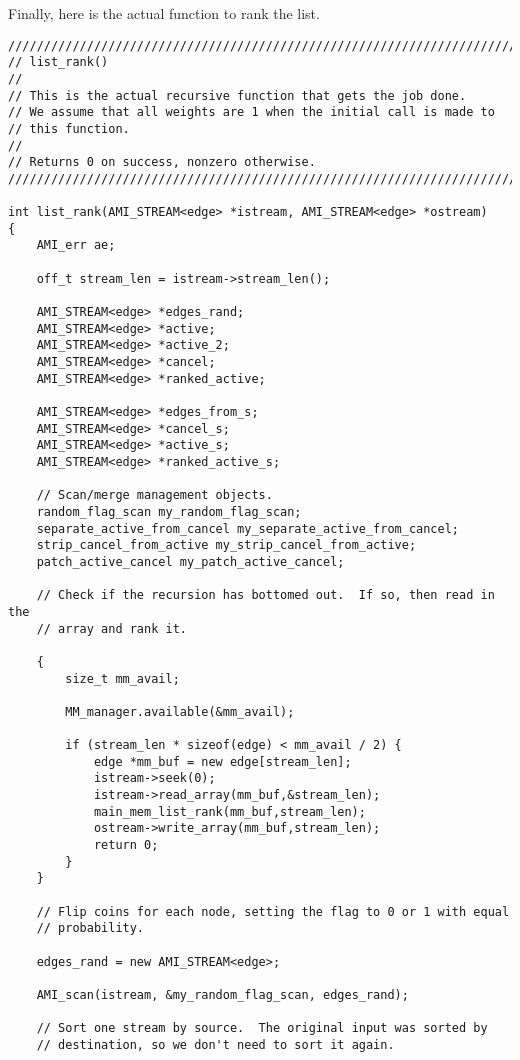 Finally, here is the actual function to rank the list.

\begin{verbatim}
////////////////////////////////////////////////////////////////////////
// list_rank()
//
// This is the actual recursive function that gets the job done.
// We assume that all weights are 1 when the initial call is made to
// this function.
//
// Returns 0 on success, nonzero otherwise.
////////////////////////////////////////////////////////////////////////

int list_rank(AMI_STREAM<edge> *istream, AMI_STREAM<edge> *ostream)
{
    AMI_err ae;
    
    off_t stream_len = istream->stream_len();

    AMI_STREAM<edge> *edges_rand;
    AMI_STREAM<edge> *active;
    AMI_STREAM<edge> *active_2;
    AMI_STREAM<edge> *cancel;
    AMI_STREAM<edge> *ranked_active;

    AMI_STREAM<edge> *edges_from_s;
    AMI_STREAM<edge> *cancel_s;
    AMI_STREAM<edge> *active_s;
    AMI_STREAM<edge> *ranked_active_s;

    // Scan/merge management objects.
    random_flag_scan my_random_flag_scan;
    separate_active_from_cancel my_separate_active_from_cancel;
    strip_cancel_from_active my_strip_cancel_from_active;
    patch_active_cancel my_patch_active_cancel;
    
    // Check if the recursion has bottomed out.  If so, then read in the
    // array and rank it.

    {
        size_t mm_avail;
        
        MM_manager.available(&mm_avail);

        if (stream_len * sizeof(edge) < mm_avail / 2) {
            edge *mm_buf = new edge[stream_len];
            istream->seek(0);
            istream->read_array(mm_buf,&stream_len);
            main_mem_list_rank(mm_buf,stream_len);
            ostream->write_array(mm_buf,stream_len);
            return 0;
        }
    }
    
    // Flip coins for each node, setting the flag to 0 or 1 with equal
    // probability.

    edges_rand = new AMI_STREAM<edge>;
    
    AMI_scan(istream, &my_random_flag_scan, edges_rand);

    // Sort one stream by source.  The original input was sorted by
    // destination, so we don't need to sort it again.


\end{verbatim}
